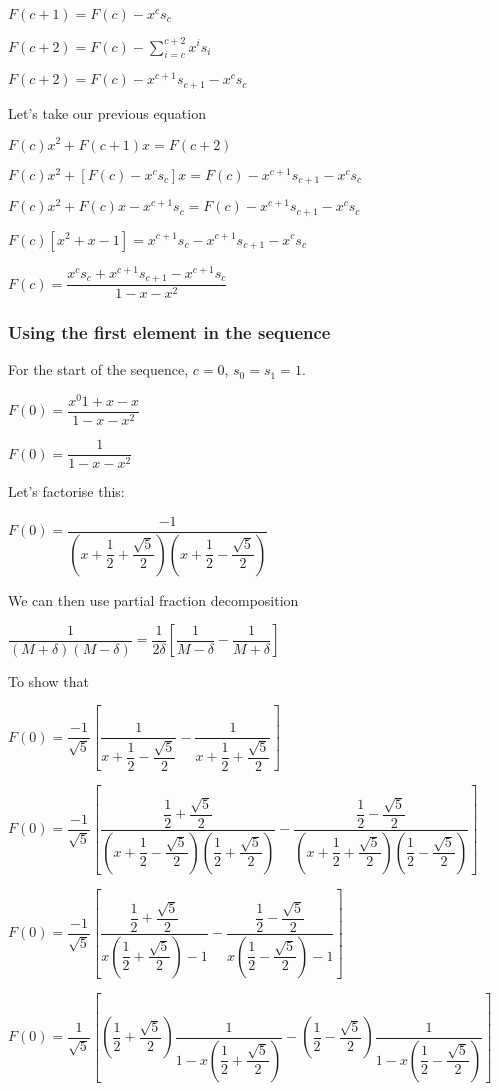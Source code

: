 \(F(c+1)=F(c)-x^c s_c\)

\(F(c+2)=F(c)-\sum^{c+2}_{i=c} x^i s_i\)

\(F(c+2)=F(c)-x^{c+1}s_{c+1}-x^c s_c\)

Let's take our previous equation

\(F(c)x^2+F(c+1)x=F(c+2)\)

\(F(c)x^2+[F(c)-x^c s_c]x=F(c)-x^{c+1}s_{c+1}-x^c s_c\)

\(F(c)x^2+F(c)x-x^{c+1} s_c=F(c)-x^{c+1}s_{c+1}-x^c s_c\)

\(F(c)[x^2+x-1]=x^{c+1}s_c-x^{c+1}s_{c+1}-x^c s_c\)

\(F(c)=\dfrac{x^c s_c + x^{c+1}s_{c+1}-x^{c+1}s_c}{1-x-x^2}\)

\subsubsection{Using the first element in the sequence}

For the start of the sequence, \(c=0\), \(s_0=s_1=1\).

\(F(0)=\dfrac{x^0 1 + x - x}{1-x-x^2}\)

\(F(0)=\dfrac{1}{1-x-x^2}\)

Let's factorise this:

\(F(0)=\dfrac{-1}{(x+\dfrac{1}{2}+\dfrac{\sqrt 5}{2})(x+\dfrac{1}{2}-\dfrac{\sqrt 5}{2})}\)

We can then use partial fraction decomposition

\(\dfrac{1}{(M+\delta)(M-\delta)}=\dfrac{1}{2\delta}[\dfrac{1}{M-\delta}-\dfrac{1}{M+\delta}]\)

To show that

\(F(0)=\dfrac{-1}{\sqrt 5}[\dfrac{1}{x+\dfrac{1}{2}-\dfrac{\sqrt 5}{2}}-\dfrac{1}{x+\dfrac{1}{2}+\dfrac{\sqrt 5}{2}}]\)

\(F(0)=\dfrac{-1}{\sqrt 5}[\dfrac{\dfrac{1}{2}+\dfrac{\sqrt 5}{2}}{(x+\dfrac{1}{2}-\dfrac{\sqrt 5}{2})(\dfrac{1}{2}+\dfrac{\sqrt 5}{2})}-\dfrac{\dfrac{1}{2}-\dfrac{\sqrt 5}{2}}{(x+\dfrac{1}{2}+\dfrac{\sqrt 5}{2})(\dfrac{1}{2}-\dfrac{\sqrt 5}{2})}]\)

\(F(0)=\dfrac{-1}{\sqrt 5}[\dfrac{\dfrac{1}{2}+\dfrac{\sqrt 5}{2}}{x(\dfrac{1}{2}+\dfrac{\sqrt 5}{2})-1}-\dfrac{\dfrac{1}{2}-\dfrac{\sqrt 5}{2}}{x(\dfrac{1}{2}-\dfrac{\sqrt 5}{2})-1}]\)

\(F(0)=\dfrac{1}{\sqrt 5}[(\dfrac{1}{2}+\dfrac{\sqrt 5}{2})\dfrac{1}{1-x(\dfrac{1}{2}+\dfrac{\sqrt 5}{2})}-(\dfrac{1}{2}-\dfrac{\sqrt 5}{2})\dfrac{1}{1-x(\dfrac{1}{2}-\dfrac{\sqrt 5}{2})}]\)

